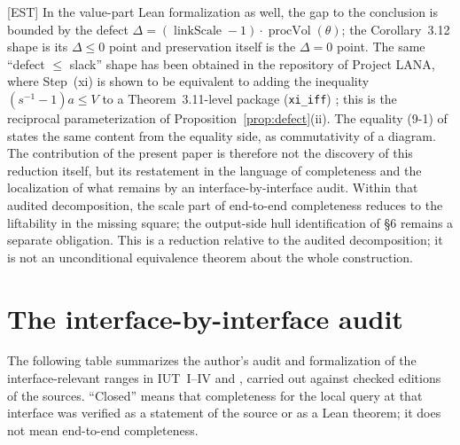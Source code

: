 \documentclass[11pt]{article}
\theoremstyle{plain}
\theoremstyle{definition}
\theoremstyle{remark}
\newcommand{\EST}{\textup{[EST]}}
\newcommand{\procVol}{\operatorname{procVol}}
\newcommand{\linkScale}{\operatorname{linkScale}}
\begin{document}
\EST{} In the value-part Lean formalization as well, the gap to the
conclusion is bounded by the defect
$\Delta=(\linkScale-1)\cdot\procVol(\theta)$; the
Corollary~3.12 shape is its $\Delta\le0$ point and preservation
itself is the $\Delta=0$ point.  The same ``defect $\le$ slack''
shape has been obtained in the repository of Project LANA, where
Step~(xi) is shown to be equivalent to adding the inequality
$(s^{-1}-1)a\le V$ to a Theorem~3.11-level package (\texttt{xi\_iff})
\cite{lana}; this is the reciprocal parameterization of
Proposition~\ref{prop:defect}(ii).  The equality (9-1) of
\cite[\S9.2]{LANA} states the same content from the equality side,
as commutativity of a diagram.  The contribution of the present
paper is therefore not the discovery of this reduction itself, but
its restatement in the language of completeness and the
localization of what remains by an interface-by-interface audit.
Within that audited decomposition, the scale part of end-to-end
completeness reduces to the liftability in the missing square; the
output-side hull identification of \S6 remains a separate
obligation.  This is a reduction relative to the audited
decomposition; it is not an unconditional equivalence theorem about
the whole construction.

\section{The interface-by-interface audit}

The following table summarizes the author's audit and formalization
of the interface-relevant ranges in IUT~I--IV and
\cite{FrdI,EtTh,AbsTopIII}, carried out against checked editions of
the sources.  ``Closed''
means that completeness for the local query at that interface was
verified as a statement of the source or as a Lean theorem; it does
not mean end-to-end completeness.
\end{document}
